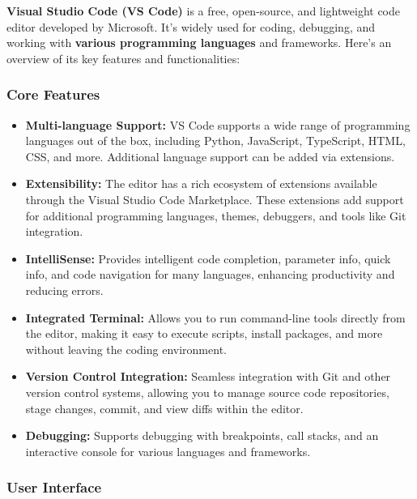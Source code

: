 \documentclass[
  letterpaper,
  DIV=11,
  numbers=noendperiod]{scrreprt}
\providecommand{\tightlist}{%
  \setlength{\itemsep}{0pt}\setlength{\parskip}{0pt}}\usepackage{longtable,booktabs,array}
\begin{document}
\textbf{Visual Studio Code (VS Code)} is a free, open-source, and
lightweight code editor developed by Microsoft. It's widely used for
coding, debugging, and working with \textbf{various programming
languages} and frameworks. Here's an overview of its key features and
functionalities:

\hypertarget{core-features}{%
\subsubsection{Core Features}\label{core-features}}

\begin{itemize}
\tightlist
\item
  \textbf{Multi-language Support:} VS Code supports a wide range of
  programming languages out of the box, including Python, JavaScript,
  TypeScript, HTML, CSS, and more. Additional language support can be
  added via extensions.
\item
  \textbf{Extensibility:} The editor has a rich ecosystem of extensions
  available through the Visual Studio Code Marketplace. These extensions
  add support for additional programming languages, themes, debuggers,
  and tools like Git integration.
\item
  \textbf{IntelliSense:} Provides intelligent code completion, parameter
  info, quick info, and code navigation for many languages, enhancing
  productivity and reducing errors.
\item
  \textbf{Integrated Terminal:} Allows you to run command-line tools
  directly from the editor, making it easy to execute scripts, install
  packages, and more without leaving the coding environment.
\item
  \textbf{Version Control Integration:} Seamless integration with Git
  and other version control systems, allowing you to manage source code
  repositories, stage changes, commit, and view diffs within the editor.
\item
  \textbf{Debugging:} Supports debugging with breakpoints, call stacks,
  and an interactive console for various languages and frameworks.
\end{itemize}

\hypertarget{user-interface}{%
\subsubsection{User Interface}\label{user-interface}}
\end{document}
